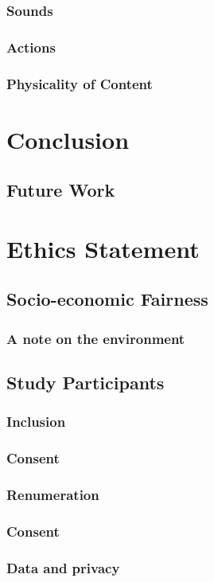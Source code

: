 \subsubsection{Sounds}\label{sec: polaris-feedback-immersion-sounds}
\subsubsection{Actions}\label{sec: polaris-feedback-immersion-actions}
\subsubsection{Physicality of Content}\label{sec: polaris-feedback-immersion-physicality}



\section{Conclusion}\label{sec: polaris-conclusion}
\subsection{Future Work}\label{sec: polaris-conclusion-future}



\section{Ethics Statement}\label{sec: polaris-ethics}
\subsection{Socio-economic Fairness}\label{sec: polaris-ethics-}
\subsubsection{A note on the environment}\label{sec: polaris-ethics-environment}

\subsection{Study Participants}\label{sec: polaris-ethics-participants}
\subsubsection{Inclusion}\label{sec: polaris-ethics-accessibility}
\subsubsection{Consent}\label{sec: polaris-ethics-inclusion}
\subsubsection{Renumeration}\label{sec: polaris-ethics-renumeration}
\subsubsection{Consent}\label{sec: polaris-ethics-consent}
\subsubsection{Data and privacy}\label{sec: polaris-ethics-data}

